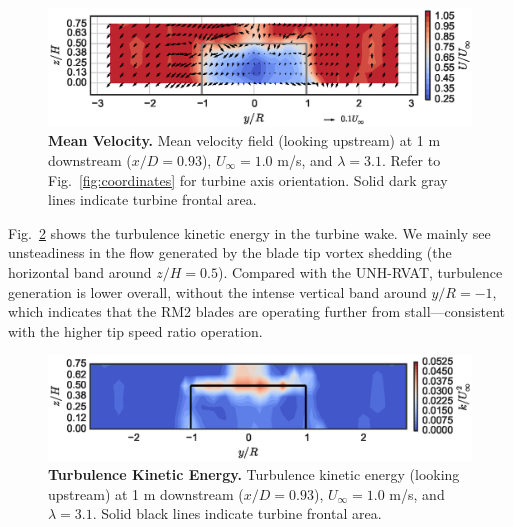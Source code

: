 \documentclass[10pt,letterpaper]{article}
\begin{document}
\begin{figure}[h]
    \includegraphics[width=\textwidth]{figures/meancontquiv.eps}

    \caption{{\bf Mean Velocity.} Mean velocity field (looking upstream) at 1 m
    downstream ($x/D=0.93$), $U_\infty=1.0$ m/s, and $\lambda=3.1$. Refer to
    Fig.~\ref{fig:coordinates} for turbine axis orientation. Solid dark gray
    lines indicate turbine frontal area.}

    \label{fig:meancontquiv}
\end{figure}


Fig.~\ref{fig:kcont} shows the turbulence kinetic energy in the turbine wake. We
mainly see unsteadiness in the flow generated by the blade tip vortex shedding
(the horizontal band around $z/H=0.5$). Compared with the UNH-RVAT, turbulence
generation is lower overall, without the intense vertical band around $y/R=-1$,
which indicates that the RM2 blades are operating further from
stall---consistent with the higher tip speed ratio operation.

\begin{figure}[h]
    \includegraphics[width=\textwidth]{figures/k_contours.eps}

    \caption{{\bf Turbulence Kinetic Energy.} Turbulence kinetic energy (looking
    upstream) at 1 m downstream ($x/D=0.93$), $U_\infty=1.0$ m/s, and
    $\lambda=3.1$. Solid black lines indicate turbine frontal area.}

    \label{fig:kcont}
\end{figure}
\end{document}
